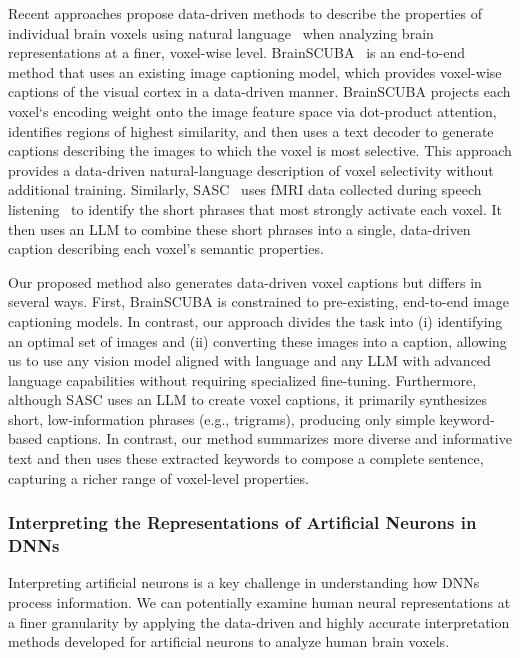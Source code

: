 Recent approaches propose data-driven methods to describe the properties of individual brain voxels using natural language~\cite{luo2023brainscuba, singh2023explainingblackboxtext} when analyzing brain representations at a finer, voxel-wise level. BrainSCUBA~\cite{luo2023brainscuba} is an end-to-end method that uses an existing image captioning model, which provides voxel-wise captions of the visual cortex in a data-driven manner. BrainSCUBA projects each voxel‘s encoding weight onto the image feature space via dot-product attention, identifies regions of highest similarity, and then uses a text decoder to generate captions describing the images to which the voxel is most selective. This approach provides a data-driven natural-language description of voxel selectivity without additional training. Similarly, SASC~\cite{singh2023explainingblackboxtext} uses fMRI data collected during speech listening~\cite{lebel2023natural} to identify the short phrases that most strongly activate each voxel. It then uses an LLM to combine these short phrases into a single, data-driven caption describing each voxel’s semantic properties. 

Our proposed method also generates data-driven voxel captions but differs in several ways. First, BrainSCUBA is constrained to pre-existing, end-to-end image captioning models. In contrast, our approach divides the task into (i) identifying an optimal set of images and (ii) converting these images into a caption, allowing us to use any vision model aligned with language and any LLM with advanced language capabilities without requiring specialized fine-tuning. Furthermore, although SASC uses an LLM to create voxel captions, it primarily synthesizes short, low-information phrases (e.g., trigrams), producing only simple keyword-based captions. In contrast, our method summarizes more diverse and informative text and then uses these extracted keywords to compose a complete sentence, capturing a richer range of voxel-level properties.

\subsubsection{Interpreting the Representations of Artificial Neurons in DNNs}
Interpreting artificial neurons is a key challenge in understanding how DNNs process information. We can potentially examine human neural representations at a finer granularity by applying the data-driven and highly accurate interpretation methods developed for artificial neurons to analyze human brain voxels.

